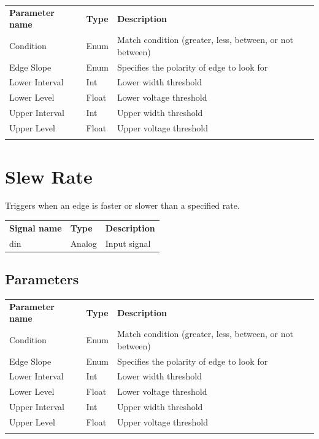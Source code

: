 \begin{tabularx}{16cm}{llX}
\thickhline
\textbf{Parameter name} & \textbf{Type} & \textbf{Description} \\
\thickhline
Condition & Enum & Match condition (greater, less, between, or not between) \\
\thickhline
Edge Slope & Enum & Specifies the polarity of edge to look for\\
\thickhline
Lower Interval & Int & Lower width threshold\\
\thickhline
Lower Level & Float & Lower voltage threshold\\
\thickhline
Upper Interval & Int & Upper width threshold\\
\thickhline
Upper Level & Float & Upper voltage threshold\\
\thickhline
\end{tabularx}

\section{Slew Rate}

Triggers when an edge is faster or slower than a specified rate.

\begin{tabularx}{16cm}{llX}
\thickhline
\textbf{Signal name} & \textbf{Type} & \textbf{Description} \\
\thickhline
din & Analog & Input signal \\
\end{tabularx}

\subsection{Parameters}

\begin{tabularx}{16cm}{llX}
\thickhline
\textbf{Parameter name} & \textbf{Type} & \textbf{Description} \\
\thickhline
Condition & Enum & Match condition (greater, less, between, or not between) \\
\thickhline
Edge Slope & Enum & Specifies the polarity of edge to look for\\
\thickhline
Lower Interval & Int & Lower width threshold\\
\thickhline
Lower Level & Float & Lower voltage threshold\\
\thickhline
Upper Interval & Int & Upper width threshold\\
\thickhline
Upper Level & Float & Upper voltage threshold\\
\thickhline
\end{tabularx}

